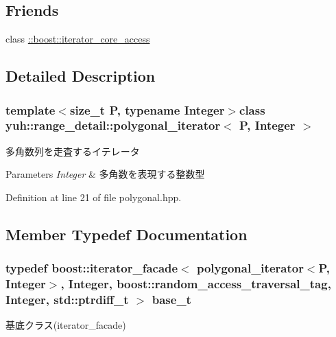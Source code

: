 \subsection*{\-Friends}
\begin{DoxyCompactItemize}
\item 
class \hyperlink{classyuh_1_1range__detail_1_1polygonal__iterator_a986bf0deaa7559f361d03122eeea4c86}{\-::boost\-::iterator\-\_\-core\-\_\-access}
\end{DoxyCompactItemize}


\subsection{\-Detailed \-Description}
\subsubsection*{template$<$size\-\_\-t \-P, typename Integer$>$class yuh\-::range\-\_\-detail\-::polygonal\-\_\-iterator$<$ P, Integer $>$}

多角数列を走査するイテレータ 
\begin{DoxyParams}{\-Parameters}
{\em \-Integer} & 多角数を表現する整数型 \\
\hline
\end{DoxyParams}


\-Definition at line 21 of file polygonal.\-hpp.



\subsection{\-Member \-Typedef \-Documentation}
\hypertarget{classyuh_1_1range__detail_1_1polygonal__iterator_acd43edf91ede982ba924e46c01501792}{
\subsubsection[{base\-\_\-t}]{\setlength{\rightskip}{0pt plus 5cm}typedef boost\-::iterator\-\_\-facade$<$ {\bf polygonal\-\_\-iterator}$<$\-P, \-Integer$>$, \-Integer, boost\-::random\-\_\-access\-\_\-traversal\-\_\-tag, \-Integer, std\-::ptrdiff\-\_\-t $>$ {\bf base\-\_\-t}}}\label{d9/d0c/classyuh_1_1range__detail_1_1polygonal__iterator_acd43edf91ede982ba924e46c01501792}
基底クラス(iterator\-\_\-facade) 

